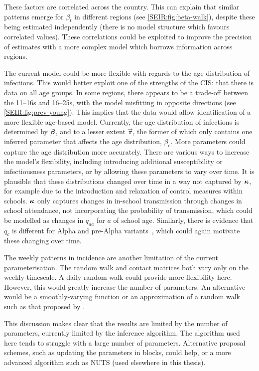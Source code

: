 \documentclass[thesis.tex]{subfiles}
\begin{document}
These factors are correlated across the country.
This can explain that similar patterns emerge for $\beta_t$ in different regions (see \cref{SEIR:fig:beta-walk}), despite these being estimated independently (\ie there is no model structure which favours correlated values).
These correlations could be exploited to improve the precision of estimates with a more complex model which borrows information across regions.

The current model could be more flexible with regards to the age distribution of infections.
This would better exploit one of the strengths of the CIS: that there is data on all age groups.
In some regions, there appears to be a trade-off between the 11--16s and 16--25s, with the model misfitting in opposite directions (see \cref{SEIR:fig:prev-young}).
This implies that the data would allow identification of a more flexible age-based model.
Currently, the age distribution of infections is determined by $\bm{\beta}$, and to a lesser extent $\vec{\pi}$, the former of which only contains one inferred parameter that affects the age distribution, $\beta_c$.
More parameters could capture the age distribution more accurately.
There are various ways to increase the model's flexibility, including introducing additional susceptibility or infectiousness parameters, or by allowing these parameters to vary over time.
It is plausible that these distributions changed over time in a way not captured by $\bm{\kappa}$, for example due to the introduction and relaxation of control measures within schools.
$\bm{\kappa}$ only captures changes in in-school transmission through changes in school attendance, not incorporating the probability of transmission, which could be modelled as changes in $q_{aa}$ for $a$ of school age.
Similarly, there is evidence that $q_c$ is different for Alpha and pre-Alpha variants~\autocite{zhuRole}, which could again motivate these changing over time.

The weekly patterns in incidence are another limitation of the current parameterisation.
The random walk and contact matrices both vary only on the weekly timescale.
A daily random walk could provide more flexibility here.
However, this would greatly increase the number of parameters.
An alternative would be a smoothly-varying function or an approximation of a random walk such as that proposed by \textcite{ghoshApproximate}.

This discussion makes clear that the results are limited by the number of parameters, currently limited by the inference algorithm.
The algorithm used here tends to struggle with a large number of parameters.
Alternative proposal schemes, such as updating the parameters in blocks, could help, or a more advanced algorithm such as NUTS (used elsewhere in this thesis).
\end{document}
